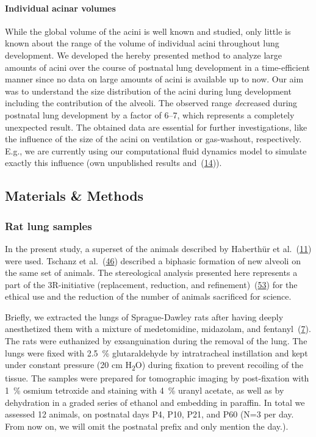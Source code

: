 \documentclass[
  american,
]{article}
\begin{document}
\hypertarget{individual-acinar-volumes}{%
\paragraph{Individual acinar volumes}\label{individual-acinar-volumes}}

While the global volume of the acini is well known and studied, only little is known about the range of the volume of individual acini throughout lung development.
We developed the hereby presented method to analyze large amounts of acini over the course of postnatal lung development in a time-efficient manner since no data on large amounts of acini is available up to now.
Our aim was to understand the size distribution of the acini during lung development including the contribution of the alveoli.
The observed range \emph{de}creased during postnatal lung development by a factor of 6--7, which represents a completely unexpected result.
The obtained data are essential for further investigations, like the influence of the size of the acini on ventilation or gas-washout, respectively.
E.g., we are currently using our computational fluid dynamics model to simulate exactly this influence (own unpublished results and~(\protect\hyperlink{ref-eb0gk6VO}{14})).

\hypertarget{materials-methods}{%
\subsection{Materials \& Methods}\label{materials-methods}}

\hypertarget{rat-lung-samples}{%
\subsubsection{Rat lung samples}\label{rat-lung-samples}}

In the present study, a superset of the animals described by Haberthür et al.~(\protect\hyperlink{ref-7YLeeyu}{11}) were used.
Tschanz et al.~(\protect\hyperlink{ref-wnl86DEM}{46}) described a biphasic formation of new alveoli on the same set of animals.
The stereological analysis presented here represents a part of the 3R-initiative (replacement, reduction, and refinement)~(\protect\hyperlink{ref-199ALtdJt}{53}) for the ethical use and the reduction of the number of animals sacrificed for science.

Briefly, we extracted the lungs of Sprague-Dawley rats after having deeply anesthetized them with a mixture of medetomidine, midazolam, and fentanyl~(\protect\hyperlink{ref-IdRLVLjl}{7}).
The rats were euthanized by exsanguination during the removal of the lung.
The lungs were fixed with 2.5~\% glutaraldehyde by intratracheal instillation and kept under constant pressure (20 cm H\textsubscript{2}O) during fixation to prevent recoiling of the tissue.
The samples were prepared for tomographic imaging by post-fixation with 1~\% osmium tetroxide and staining with 4~\% uranyl acetate, as well as by dehydration in a graded series of ethanol and embedding in paraffin.
In total we assessed 12 animals, on postnatal days P4, P10, P21, and P60 (N=3 per day.
From now on, we will omit the postnatal prefix and only mention the day.).
\end{document}
